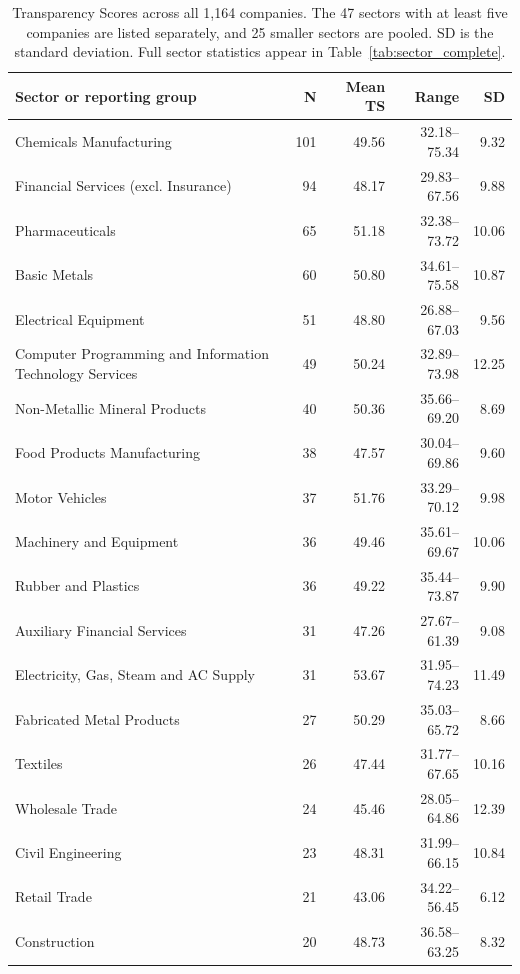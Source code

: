 \begin{table}[p]
\begin{singlepagetable}
\centering
\begingroup
\footnotesize
\setlength{\tabcolsep}{5pt}
\renewcommand{\arraystretch}{1.10}
\caption{Transparency Scores across all 1,164 companies. The 47 sectors with at least five companies are listed separately, and 25 smaller sectors are pooled. SD is the standard deviation. Full sector statistics appear in Table~\ref{tab:sector_complete}.}
\label{tab:all_sectors}
\begin{tabularx}{\linewidth}{@{}Yrrrr@{}}
\toprule\textbf{Sector or reporting group} & \textbf{N} & \textbf{Mean TS} & \textbf{Range} & \textbf{SD}\\\midrule
Chemicals Manufacturing & 101 & 49.56 & 32.18--75.34 & 9.32 \\
Financial Services (excl. Insurance) & 94 & 48.17 & 29.83--67.56 & 9.88 \\
Pharmaceuticals & 65 & 51.18 & 32.38--73.72 & 10.06 \\
Basic Metals & 60 & 50.80 & 34.61--75.58 & 10.87 \\
Electrical Equipment & 51 & 48.80 & 26.88--67.03 & 9.56 \\
Computer Programming and Information Technology Services & 49 & 50.24 & 32.89--73.98 & 12.25 \\
Non-Metallic Mineral Products & 40 & 50.36 & 35.66--69.20 & 8.69 \\
Food Products Manufacturing & 38 & 47.57 & 30.04--69.86 & 9.60 \\
Motor Vehicles & 37 & 51.76 & 33.29--70.12 & 9.98 \\
Machinery and Equipment & 36 & 49.46 & 35.61--69.67 & 10.06 \\
Rubber and Plastics & 36 & 49.22 & 35.44--73.87 & 9.90 \\
Auxiliary Financial Services & 31 & 47.26 & 27.67--61.39 & 9.08 \\
Electricity, Gas, Steam and AC Supply & 31 & 53.67 & 31.95--74.23 & 11.49 \\
Fabricated Metal Products & 27 & 50.29 & 35.03--65.72 & 8.66 \\
Textiles & 26 & 47.44 & 31.77--67.65 & 10.16 \\
Wholesale Trade & 24 & 45.46 & 28.05--64.86 & 12.39 \\
Civil Engineering & 23 & 48.31 & 31.99--66.15 & 10.84 \\
Retail Trade & 21 & 43.06 & 34.22--56.45 & 6.12 \\
Construction & 20 & 48.73 & 36.58--63.25 & 8.32 \\

\end{tabularx}
\end{singlepagetable}
\end{table}
